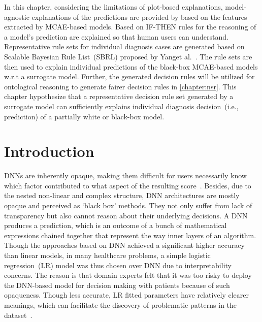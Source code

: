 \hspace*{3.5mm} In this chapter, considering the limitations of plot-based explanations, model-agnostic explanations of the predictions are provided by based on the features extracted by MCAE-based models. Based on IF-THEN rules for the reasoning of a model's prediction are explained so that human users can understand.  %
Representative rule sets for individual diagnosis cases are generated based on Scalable Bayesian Rule List~(SBRL) proposed by Yanget al.~\cite{BayesianRule}. The rule sets are then used to explain individual predictions of the black-box MCAE-based models w.r.t a surrogate model. Further, the generated decision rules will be utilized for ontological reasoning to generate fairer decision rules in \cref{chapter:nsr}. This chapter hypothesize that a representative decision rule set generated by a surrogate model can sufficiently explains individual diagnosis decision~(i.e., prediction) of a partially white or black-box model. 

\section{Introduction} \label{chapter_7:intro}
DNNs are inherently opaque, making them difficult for users necessarily know which factor contributed to what aspect of the resulting score~\cite{ribeiro2018anchors}. Besides, due to the nested non-linear and complex structure, DNN architectures are mostly opaque and perceived as `black box' methods. They not only suffer from lack of transparency but also cannot reason about their underlying decisions. A DNN produces a prediction, which is an outcome of a bunch of mathematical expressions chained together that represent the way inner layers of an algorithm. Though the approaches based on DNN achieved a significant higher accuracy than linear models, in many healthcare problems, a simple logistic regression~(LR) model was thus chosen over DNN due to interpretability concerns. The reason is that domain experts felt that it was too risky to deploy the DNN-based model for decision making with patients because of such opaqueness. Though less accurate, LR fitted parameters have relatively clearer meanings, which can facilitate the discovery of problematic patterns in the dataset~\cite{ming2018rulematrix}. 

